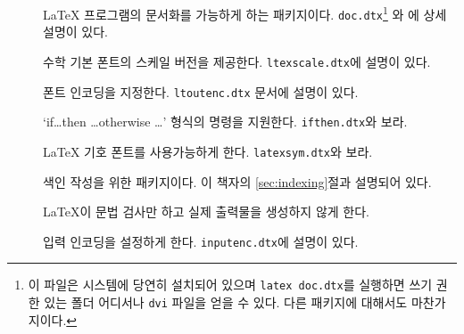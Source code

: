 \begin{table}[btp]
\caption{\LaTeX{} 기본 배포 패키지} \label{packages}
\begin{lined}{\textwidth}
\begin{description}
\item[\normalfont{}] 
   \LaTeX{} 프로그램의 문서화를 가능하게 하는 패키지이다. \texttt{doc.dtx}\footnote{%
    이 파일은 시스템에 당연히 설치되어 있으며 \texttt{latex doc.dtx}를 실행하면 
    쓰기 권한 있는 폴더 어디서나 \texttt{dvi} 파일을
    얻을 수 있다. 다른 패키지에 대해서도 마찬가지이다.
   }%
   와 \companion 에 상세 설명이 있다.

\item[\normalfont{}] 
   수학 기본 폰트의 스케일 버전을 제공한다. \texttt{ltexscale.dtx}에 설명이 있다.

\item[\normalfont{}] 
   폰트 인코딩을 지정한다. \texttt{ltoutenc.dtx} 문서에 설명이 있다.

\item[\normalfont{}] 
  `if\ldots then \ldots otherwise \ldots' 형식의 명령을 지원한다. \texttt{ifthen.dtx}와  보라.

\item[\normalfont{}] 
  \LaTeX{} 기호 폰트를 사용가능하게 한다. \texttt{latexsym.dtx}와  보라.

\item[\normalfont{}] 
  색인 작성을 위한 패키지이다. 이 책자의 \ref{sec:indexing}절과  설명되어 있다.

\item[\normalfont{}] 
   \LaTeX 이 문법 검사만 하고 실제 출력물을 생성하지 않게 한다.

\item[\normalfont{}] 
   입력 인코딩을 설정하게 한다.
   \texttt{inputenc.dtx}에 설명이 있다.
\end{description}
\end{lined}
\end{table}



